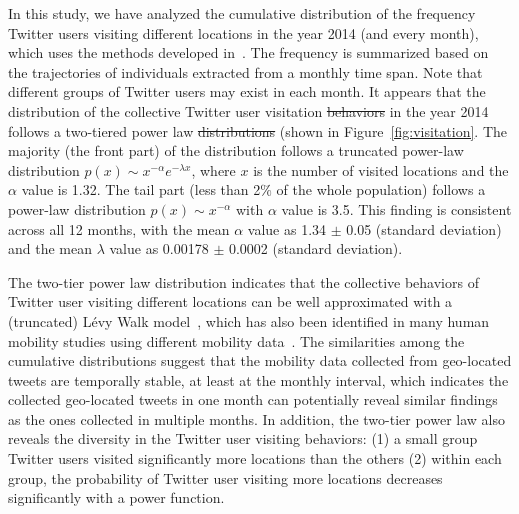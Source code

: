 \documentclass[ijgi,article,accept,moreauthors,pdftex,10pt,a4paper]{mdpi}
\theoremstyle{mdpi}
\newcounter{ex}
\newcounter{re}
\theoremstyle{mdpidefinition}
\providecommand{\DIFadd}[1]{{\protect\color{blue}\uwave{#1}}} %
\providecommand{\DIFdel}[1]{{\protect\color{red}\sout{#1}}}                      %
\providecommand{\DIFaddbegin}{} %
\providecommand{\DIFaddend}{} %
\providecommand{\DIFdelbegin}{} %
\providecommand{\DIFdelend}{} %
\begin{document}
In this study, we have analyzed the cumulative distribution of the frequency \DIFaddbegin \DIFadd{of }\DIFaddend Twitter users visiting different locations in the year 2014 (and every month), which uses the methods developed in~\cite{clauset2009power}. 
The frequency is summarized based on the trajectories of individuals extracted from a monthly time span.
Note that different groups of Twitter users may exist in each month. 
It appears that the distribution of the collective Twitter user visitation \DIFdelbegin \DIFdel{behaviors }\DIFdelend \DIFaddbegin \DIFadd{behavior }\DIFaddend in the year 2014 follows a two-tiered power law \DIFdelbegin \DIFdel{distributions }\DIFdelend \DIFaddbegin \DIFadd{distribution }\DIFaddend (shown in Figure~\ref{fig:visitation}.
The majority (the front part) of the distribution follows a truncated power-law distribution $p(x)\sim x^{-\alpha}e^{-\lambda x}$, where $x$ is the number of visited locations and the $\alpha$ value is 1.32.
The tail part (less than 2$\%$ of the whole population) follows a power-law distribution $p(x)\sim x^{-\alpha}$ with $\alpha$ value is 3.5.
This finding is consistent across all 12 months, with the mean $\alpha$ value as 1.34 $ \pm$  0.05 (standard deviation) and the mean $\lambda$ value as 0.00178 $ \pm$  0.0002 (standard deviation).

The two-tier power law distribution indicates that the collective behaviors of Twitter user visiting different locations can be well approximated with a (truncated) L\'{e}vy Walk model~\cite{ reynolds2012truncated, rhee2011levy}, which has also been identified in many human mobility studies using different mobility data~\cite{zhao2015explaining}.
The similarities among the cumulative distributions suggest that the mobility data collected from geo-located tweets are temporally stable, at least at the monthly interval, which indicates the collected geo-located tweets in one month can potentially reveal similar findings as the ones collected in multiple months.
In addition, the two-tier power law also reveals the diversity in the Twitter user visiting behaviors: (1) a small group Twitter users visited significantly more locations than the others (2) within each group, the probability of Twitter user visiting more locations decreases significantly with a power function.
\end{document}
